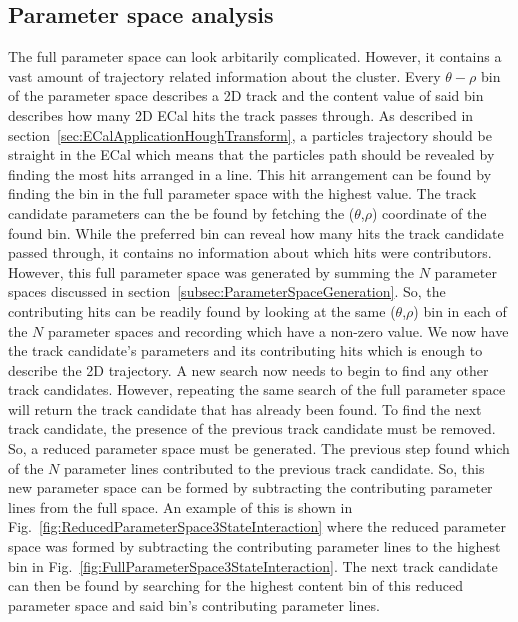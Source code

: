\subsection{Parameter space analysis}
\label{subsec:ParameterSpaceAnalysis}
The full parameter space can look arbitarily complicated. However, it contains a vast amount of trajectory related information about the cluster.  Every $\theta-\rho$ bin of the parameter space describes a 2D track and the content value of said bin describes how many 2D ECal hits the track passes through.  As described in section~\ref{sec:ECalApplicationHoughTransform}, a particles trajectory should be straight in the ECal which means that the particles path should be revealed by finding the most hits arranged in a line.  This hit arrangement can be found by finding the bin in the full parameter space with the highest value.  The track candidate parameters can the be found by fetching the ($\theta$,$\rho$) coordinate of the found bin.
\newline
While the preferred bin can reveal how many hits the track candidate passed through, it contains no information about which hits were contributors.  However, this full parameter space was generated by summing the $N$ parameter spaces discussed in section~\ref{subsec:ParameterSpaceGeneration}.  So, the contributing hits can be readily found by looking at the same ($\theta$,$\rho$) bin in each of the $N$ parameter spaces and recording which have a non-zero value.  We now have the track candidate's parameters and its contributing hits which is enough to describe the 2D trajectory.
\newline
A new search now needs to begin to find any other track candidates.  However, repeating the same search of the full parameter space will return the track candidate that has already been found.  To find the next track candidate, the presence of the previous track candidate must be removed.  So, a reduced parameter space must be generated. The previous step found which of the $N$ parameter lines contributed to the previous track candidate.  So, this new parameter space can be formed by subtracting the contributing parameter lines from the full space.  An example of this is shown in Fig.~\ref{fig:ReducedParameterSpace3StateInteraction} where the reduced parameter space was formed by subtracting the contributing parameter lines to the highest bin in Fig.~\ref{fig:FullParameterSpace3StateInteraction}.  The next track candidate can then be found by searching for the highest content bin of this reduced parameter space and said bin's contributing parameter lines. 
